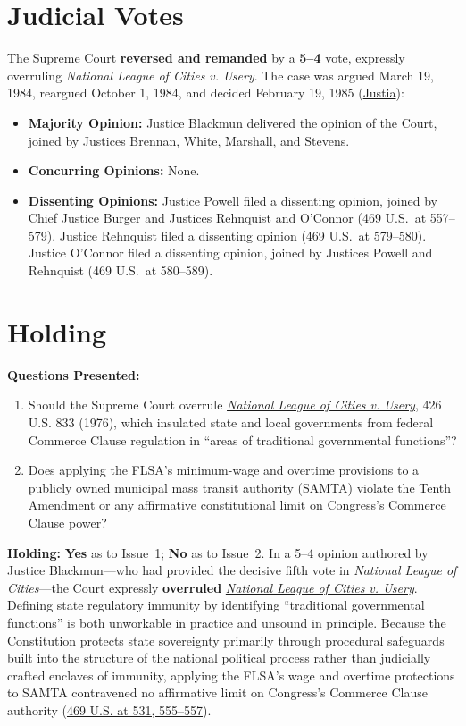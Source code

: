 \documentclass[12pt]{article}
\begin{document}
\section{Judicial Votes}
The Supreme Court \textbf{reversed and remanded} by a \textbf{5--4} vote, expressly overruling \textit{National League of Cities v. Usery}. The case was argued March 19, 1984, reargued October 1, 1984, and decided February 19, 1985 (\href{https://supreme.justia.com/cases/federal/us/469/528/}{Justia}):

\begin{itemize}
    \item \textbf{Majority Opinion:} Justice Blackmun delivered the opinion of the Court, joined by Justices Brennan, White, Marshall, and Stevens.
    \item \textbf{Concurring Opinions:} None.
    \item \textbf{Dissenting Opinions:} Justice Powell filed a dissenting opinion, joined by Chief Justice Burger and Justices Rehnquist and O'Connor (469 U.S.\ at 557--579). Justice Rehnquist filed a dissenting opinion (469 U.S.\ at 579--580). Justice O'Connor filed a dissenting opinion, joined by Justices Powell and Rehnquist (469 U.S.\ at 580--589).
\end{itemize}

\section{Holding}
\textbf{Questions Presented:}

\begin{enumerate}
    \item Should the Supreme Court overrule \href{https://supreme.justia.com/cases/federal/us/426/833/}{\textit{National League of Cities v. Usery}}, 426 U.S. 833 (1976), which insulated state and local governments from federal Commerce Clause regulation in ``areas of traditional governmental functions''?
    \item Does applying the FLSA's minimum-wage and overtime provisions to a publicly owned municipal mass transit authority (SAMTA) violate the Tenth Amendment or any affirmative constitutional limit on Congress's Commerce Clause power?
\end{enumerate}

\textbf{Holding:} \textbf{Yes} as to Issue~1; \textbf{No} as to Issue~2. In a 5--4 opinion authored by Justice Blackmun---who had provided the decisive fifth vote in \textit{National League of Cities}---the Court expressly \textbf{overruled} \href{https://supreme.justia.com/cases/federal/us/426/833/}{\textit{National League of Cities v. Usery}}. Defining state regulatory immunity by identifying ``traditional governmental functions'' is both unworkable in practice and unsound in principle. Because the Constitution protects state sovereignty primarily through procedural safeguards built into the structure of the national political process rather than judicially crafted enclaves of immunity, applying the FLSA's wage and overtime protections to SAMTA contravened no affirmative limit on Congress's Commerce Clause authority (\href{https://supreme.justia.com/cases/federal/us/469/528/}{469 U.S. at 531, 555--557}).
\end{document}
